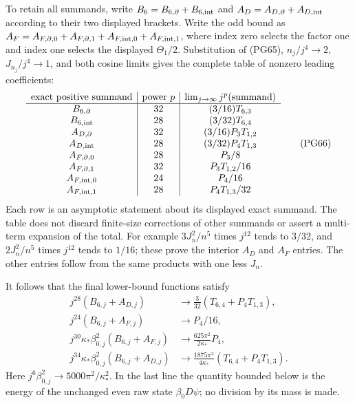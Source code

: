 \documentclass[11pt]{article}
\begin{document}
To retain all summands, write \(B_6=B_{6,\partial}+B_{6,{\rm int}}\)
and \(A_D=A_{D,\partial}+A_{D,{\rm int}}\) according to their
two displayed brackets. Write the odd bound as
\(A_F=A_{F,\partial,0}+A_{F,\partial,1}
+A_{F,{\rm int},0}+A_{F,{\rm int},1}\), where index zero
selects the factor one and index one selects the displayed
\(\Theta_1/2\). Substitution of (PG65), \(n_j/j^4\to2\),
\(J_{n_j}/j^4\to1\), and both cosine limits gives the complete
table of nonzero leading coefficients:
\[
 \begin{array}{c|c|c}
 \text{exact positive summand}&\text{power }p&
                 \lim_{j\to\infty}j^p(\text{summand})\\ \hline
 B_{6,\partial}&32&(3/16)T_{6,3}\\
 B_{6,{\rm int}}&28&(3/32)T_{6,4}\\
 A_{D,\partial}&32&(3/16)P_3T_{1,2}\\
 A_{D,{\rm int}}&28&(3/32)P_4T_{1,3}\\
 A_{F,\partial,0}&28&P_3/8\\
 A_{F,\partial,1}&32&P_3T_{1,2}/16\\
 A_{F,{\rm int},0}&24&P_4/16\\
 A_{F,{\rm int},1}&28&P_4T_{1,3}/32
 \end{array}\tag{PG66}
\]
Each row is an asymptotic statement about its displayed exact
summand. The table does not discard finite-size corrections of
other summands or assert a multi-term expansion of the total.
For example \(3J_n^2/n^5\) times \(j^{12}\) tends to \(3/32\),
and \(2J_n^2/n^5\) times \(j^{12}\) tends to \(1/16\);
these prove the interior \(A_D\) and \(A_F\) entries. The other
entries follow from the same products with one less \(J_n\).

It follows that the final lower-bound functions satisfy
\[
 \begin{aligned}
 j^{28}(B_{6,j}+A_{D,j})
       &\longrightarrow\frac3{32}(T_{6,4}+P_4T_{1,3}),\\
 j^{24}(B_{6,j}+A_{F,j})
       &\longrightarrow P_4/16,\\
 j^{30}\kappa_*\beta_{0,j}^2(B_{6,j}+A_{F,j})
       &\longrightarrow\frac{625\pi^2}{2\kappa_*}P_4,\\
 j^{34}\kappa_*\beta_{0,j}^2(B_{6,j}+A_{D,j})
       &\longrightarrow\frac{1875\pi^2}{4\kappa_*}
                                      (T_{6,4}+P_4T_{1,3}) .
 \end{aligned}\tag{PG67}
\]
Here \(j^6\beta_{0,j}^2\to5000\pi^2/\kappa_*^2\).
In the last line the quantity bounded below is the energy of
the unchanged even raw state \(\beta_0D\psi\); no division by
its mass is made.
\end{document}
